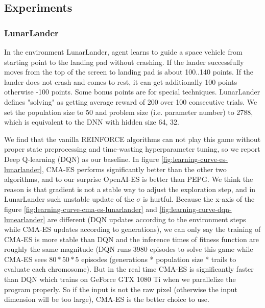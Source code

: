 \documentclass[a4paper]{article}
\begin{document}
\subsection{Experiments}
\label{sec:ESRL-exp}

\subsubsection*{LunarLander}
In the environment LunarLander, agent learns to guide a space vehicle from starting point to the landing pad without crashing. If the lander  successfully moves from the top of the screen to landing pad is about 100..140 points. If the lander does not crash and comes to rest, it can get additionally 100 points otherwise -100 points. Some bonus points are for special techniques. LunarLander defines "solving" as getting average reward of 200 over 100 consecutive trials.
We set the population size to 50 and problem size (i.e. parameter number) to 2788, which is equivalent to the DNN with hidden size 64, 32.

We find that the vanilla REINFORCE algorithms can not play this game without proper state preprocessing and time-wasting hyperparameter tuning, so we report Deep Q-learning (DQN) as our baseline. In figure \ref{fig:learning-curve-es-lunarlander}, CMA-ES performs significantly better than the other two algorithms, and to our surprise OpenAI-ES is better than PEPG. We think the reason is that gradient is not a stable way to adjust the exploration step, and in LunarLander such unstable update of the $\sigma$ is hurtful. Because the x-axis of the figure \ref{fig:learning-curve-cma-es-lunarlander} and \ref{fig:learning-curve-dqn-lunearlander} are different (DQN updates according to the environment steps while CMA-ES updates according to generations), we can only say the training of CMA-ES is more stable than DQN and the inference times of fitness function are roughly the same magnitude (DQN runs 3980 episodes to solve this game while CMA-ES sees $80 * 50 * 5$ episodes (generations * population size * trails to evaluate each chromosome). But in the real time CMA-ES is significantly faster than DQN which trains on GeForce GTX 1080 Ti when we parallelize the program properly. So if the input is not the raw pixel (otherwise the input dimension will be too large), CMA-ES is the better choice to use.
\end{document}
